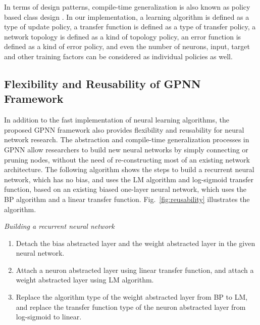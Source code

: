 \documentclass[procedia]{easychair}
\begin{document}
In terms of design patterns, compile-time generalization is also known as policy based class design \cite{alexandrescu2001policy}.  In our implementation, a learning algorithm is defined as a type of update policy, a transfer function is defined as a type of transfer policy, a network topology is defined as a kind of topology policy, an error function is defined as a kind of error policy, and even the number of neurons, input, target and other training factors can be considered as individual policies as well.

\subsection{Flexibility and Reusability of GPNN Framework}

In addition to the fast implementation of neural learning algorithms, the proposed GPNN framework also provides flexibility and reusability for neural network research.  The abstraction and compile-time generalization processes in GPNN allow researchers to build new neural networks by simply connecting or pruning nodes, without the need of re-constructing most of an existing network architecture.  The following algorithm shows the steps to build a recurrent neural network, which has no bias, and uses the LM algorithm and log-sigmoid transfer function, based on an existing biased one-layer neural network, which uses the BP algorithm and a linear transfer function.  Fig.~\ref{fig:reusability} illustrates the algorithm.

\textit{Building a recurrent neural network}

\begin{enumerate}
    \item Detach the bias abstracted layer and the weight abstracted layer in the given neural network.
    \item Attach a neuron abstracted layer using linear transfer function, and attach a weight abstracted layer using LM algorithm.
    \item Replace the algorithm type of the weight abstracted layer from BP to LM, and replace the transfer function type of the neuron abstracted layer from log-sigmoid to linear.
\end{enumerate}
\end{document}
